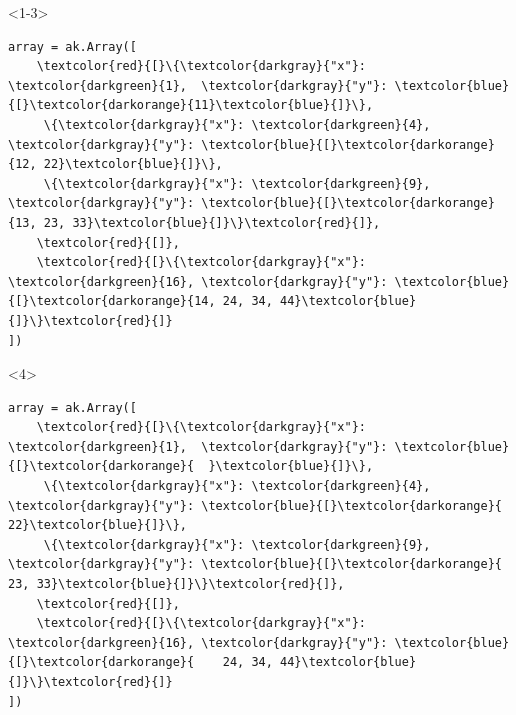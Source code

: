 \documentclass[aspectratio=169]{beamer}
\begin{document}
\begin{frame}[fragile]{}
\vspace{0.5 cm}

\begin{onlyenv}<1-3>
\begin{Verbatim}[commandchars=\\\{\}]
array = ak.Array([
    \textcolor{red}{[}\{\textcolor{darkgray}{"x"}: \textcolor{darkgreen}{1},  \textcolor{darkgray}{"y"}: \textcolor{blue}{[}\textcolor{darkorange}{11}\textcolor{blue}{]}\},
     \{\textcolor{darkgray}{"x"}: \textcolor{darkgreen}{4},  \textcolor{darkgray}{"y"}: \textcolor{blue}{[}\textcolor{darkorange}{12, 22}\textcolor{blue}{]}\},
     \{\textcolor{darkgray}{"x"}: \textcolor{darkgreen}{9},  \textcolor{darkgray}{"y"}: \textcolor{blue}{[}\textcolor{darkorange}{13, 23, 33}\textcolor{blue}{]}\}\textcolor{red}{]},
    \textcolor{red}{[]},
    \textcolor{red}{[}\{\textcolor{darkgray}{"x"}: \textcolor{darkgreen}{16}, \textcolor{darkgray}{"y"}: \textcolor{blue}{[}\textcolor{darkorange}{14, 24, 34, 44}\textcolor{blue}{]}\}\textcolor{red}{]}
])
\end{Verbatim}
\end{onlyenv}\begin{onlyenv}<4>
\begin{Verbatim}[commandchars=\\\{\}]
array = ak.Array([
    \textcolor{red}{[}\{\textcolor{darkgray}{"x"}: \textcolor{darkgreen}{1},  \textcolor{darkgray}{"y"}: \textcolor{blue}{[}\textcolor{darkorange}{  }\textcolor{blue}{]}\},
     \{\textcolor{darkgray}{"x"}: \textcolor{darkgreen}{4},  \textcolor{darkgray}{"y"}: \textcolor{blue}{[}\textcolor{darkorange}{    22}\textcolor{blue}{]}\},
     \{\textcolor{darkgray}{"x"}: \textcolor{darkgreen}{9},  \textcolor{darkgray}{"y"}: \textcolor{blue}{[}\textcolor{darkorange}{    23, 33}\textcolor{blue}{]}\}\textcolor{red}{]},
    \textcolor{red}{[]},
    \textcolor{red}{[}\{\textcolor{darkgray}{"x"}: \textcolor{darkgreen}{16}, \textcolor{darkgray}{"y"}: \textcolor{blue}{[}\textcolor{darkorange}{    24, 34, 44}\textcolor{blue}{]}\}\textcolor{red}{]}
])
\end{Verbatim}
\end{onlyenv}


\end{frame}
\end{document}
